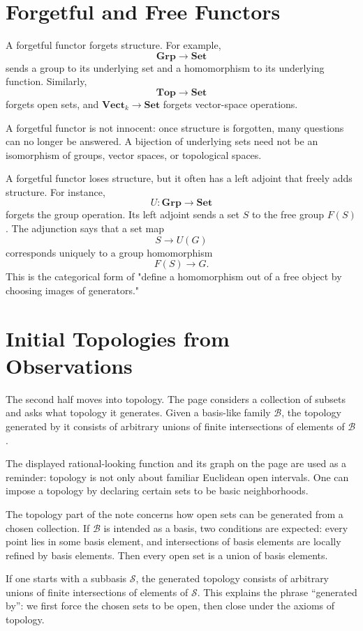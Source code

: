 \section{Forgetful and Free Functors}

A forgetful functor forgets structure.  For example,
\[
  \mathbf{Grp}\to\mathbf{Set}
\]
sends a group to its underlying set and a homomorphism to its underlying function.  Similarly,
\[
  \mathbf{Top}\to\mathbf{Set}
\]
forgets open sets, and \(\mathbf{Vect}_k\to\mathbf{Set}\) forgets vector-space operations.

A forgetful functor is not innocent: once structure is forgotten, many questions can no longer be answered.  A bijection of underlying sets need not be an isomorphism of groups, vector spaces, or topological spaces.

A forgetful functor loses structure, but it often has a left adjoint that freely adds structure.  For instance,
\[
  U:\mathbf{Grp}\to\mathbf{Set}
\]
forgets the group operation.  Its left adjoint sends a set \(S\) to the free group \(F(S)\).  The adjunction says that a set map
\[
  S\to U(G)
\]
corresponds uniquely to a group homomorphism
\[
  F(S)\to G.
\]
This is the categorical form of "define a homomorphism out of a free object by choosing images of generators."

\section{Initial Topologies from Observations}

The second half moves into topology.  The page considers a collection of subsets and asks what topology it generates.  Given a basis-like family \(\mathcal B\), the topology generated by it consists of arbitrary unions of finite intersections of elements of \(\mathcal B\).

The displayed rational-looking function and its graph on the page are used as a reminder: topology is not only about familiar Euclidean open intervals.  One can impose a topology by declaring certain sets to be basic neighborhoods.

The topology part of the note concerns how open sets can be generated from a chosen collection.  If \(\mathcal B\) is intended as a basis, two conditions are expected: every point lies in some basis element, and intersections of basis elements are locally refined by basis elements.  Then every open set is a union of basis elements.

If one starts with a subbasis \(\mathcal S\), the generated topology consists of arbitrary unions of finite intersections of elements of \(\mathcal S\).  This explains the phrase “generated by”: we first force the chosen sets to be open, then close under the axioms of topology.

